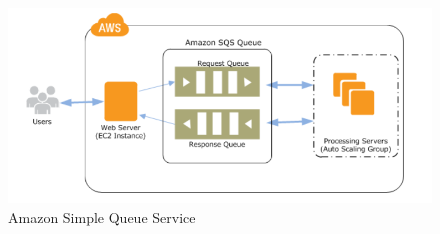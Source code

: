 \begin{itemize}
\begin{figure}[H]
\begin{center}
            \includegraphics[scale=0.8]{images/hieu/chap-2/write-request-1.png}
            \vspace*{5mm}
            \caption{Amazon Simple Queue Service}
            \end{center}
        \end{figure}


\end{itemize}
